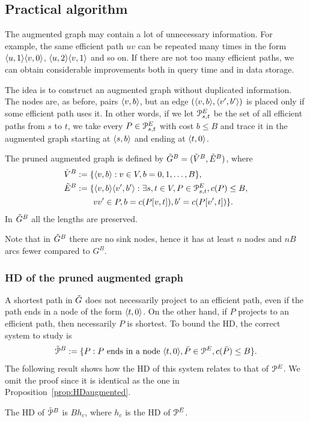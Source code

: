 \subsection{Practical algorithm}
The augmented graph may contain a lot of unnecessary information.
For example, the same efficient path $uv$ can be repeated many times in the form $\langle u,1\rangle\langle v,0\rangle$, $\langle u,2\rangle\langle v,1\rangle$ and so on.
If there are not too many efficient paths, we can obtain considerable improvements both in query time and in data storage.

The idea is to construct an augmented graph without duplicated information.
The nodes are, as before, pairs $\langle v,b\rangle$, but an edge $(\langle v,b\rangle,\langle v',b'\rangle)$ is placed only if some efficient path uses it.
In other words, if we let $\mathcal{P}_{s,t}^E$ be the set of all efficient paths from $s$ to $t$, we take every $P\in \mathcal{P}_{s,t}^E$ with cost $b\leq B$ and trace it in the augmented graph starting at $\langle s,b\rangle$ and ending at $\langle t,0\rangle$.

\begin{definition}
The pruned augmented graph is defined by $\tilde G^B=(\tilde V^B,\tilde E^B)$, where
\begin{align*}
\tilde V^B &:=\{\langle v,b\rangle: v\in V, b=0,1,\ldots,B\},\\
\tilde E^B &:=\{\langle v,b\rangle\langle v',b'\rangle : \exists s,t\in V, P\in\mathcal{P}^E_{s,t}, c(P)\leq B, \\
&\qquad vv'\in P, b=c(P[v,t]), b'=c(P[v',t])  \}.
\end{align*}
In $\tilde G^B$ all the lengths are preserved.
\end{definition}
Note that in $\tilde G^B$ there are no sink nodes, hence it has at least $n$ nodes and $nB$ arcs fewer compared to $G^B$.

\subsubsection{HD of the pruned augmented graph}

A shortest path in $\tilde G$ does not necessarily project to an efficient path, even if the path ends in a node of the form $\langle t,0\rangle$.
On the other hand, if $P$ projects to an efficient path, then necessarily $P$ is shortest. 
To bound the HD, the correct system to study is
\[
\tilde{\mathcal{P}}^B:=\{P: P\text{ ends in a node }\langle t,0\rangle, \bar P\in \mathcal{P}^E, c(\bar P)\leq B \}.
\]
The following result shows how the HD of this system relates to that of $\mathcal{P}^E$.
We omit the proof since it is identical as the one in Proposition~\ref{prop:HDaugmented}.
\begin{proposition}
The HD of $\tilde{\mathcal{P}}^B$ is $Bh_c$, where $h_c$ is the HD of $\mathcal{P}^E$.
\end{proposition}

